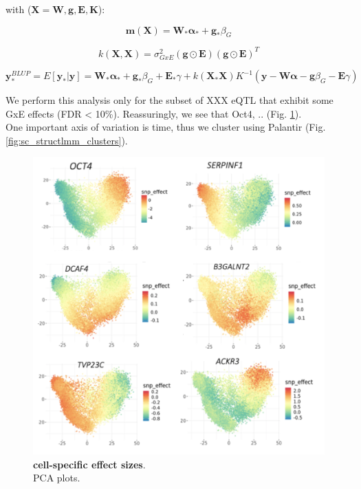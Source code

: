 with ($\mathbf{X} = {\mathbf{W},\mathbf{g},\mathbf{E},\mathbf{K}}$):

\begin{equation}
    \mathbf{m}(\mathbf{X}) = \mathbf{W}_*\boldsymbol{\alpha}_{*}+\mathbf{g}_*\beta_G
\end{equation}

\begin{equation}
    k(\mathbf{X},\mathbf{X}) = \sigma_{GxE}^2(\mathbf{g}\odot\mathbf{E})(\mathbf{g}\odot\mathbf{E})^T
\end{equation}

\begin{equation}
\mathbf{y}_{*}^{BLUP} = E[\mathbf{y}_*|\mathbf{y}] = 
\mathbf{W}_*\boldsymbol{\alpha}_{*}+\mathbf{g}_*\beta_G+\mathbf{E}_*\gamma + 
k(\mathbf{X}_*\mathbf{X})K^{-1}(\mathbf{y}-\mathbf{W}\boldsymbol{\alpha}-\mathbf{g}\beta_G-\mathbf{E}\gamma)
\end{equation}

We perform this analysis only for the subset of XXX eQTL that exhibit some GxE effects (FDR < 10\%).
Reassuringly, we see that Oct4, .. (Fig. \ref{fig:sc_structlmm_pcas}).\\

One important axis of variation is time, thus we cluster using Palantir \cite{setty2019characterization}
(Fig. \ref{fig:sc_structlmm_clusters}).

\begin{figure}[htbp]
\centering
\includegraphics[width=15.5cm]{Chapter6/Fig/sc_structlmm_pcas.png}
\caption[cell-specific effect sizes]{\textbf{cell-specific effect sizes}.\\
PCA plots.}
\label{fig:sc_structlmm_pcas}
\end{figure}


